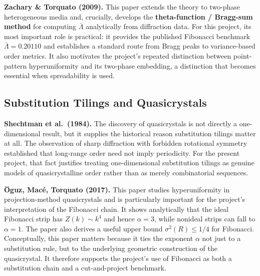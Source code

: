 \documentclass[11pt,letterpaper]{article}
\begin{document}
\vspace{0.4em}
\noindent\textbf{Zachary \& Torquato (2009).}
This paper extends the theory to two-phase heterogeneous media and, crucially, develops
the \textbf{theta-function / Bragg-sum method} for computing $\bar\Lambda$ analytically
from diffraction data.
For this project, its most important role is practical: it provides the published
Fibonacci benchmark $\bar\Lambda = 0.20110$ and establishes a standard route from Bragg
peaks to variance-based order metrics.
It also motivates the project's repeated distinction between point-pattern hyperuniformity
and its two-phase embedding, a distinction that becomes essential when spreadability is used.

\subsection{Substitution Tilings and Quasicrystals}

\noindent\textbf{Shechtman et al.\ (1984).}
The discovery of quasicrystals is not directly a one-dimensional result, but it supplies
the historical reason substitution tilings matter at all.
The observation of sharp diffraction with forbidden rotational symmetry established that
long-range order need not imply periodicity.
For the present project, that fact justifies treating one-dimensional substitution tilings
as genuine models of quasicrystalline order rather than as merely combinatorial sequences.

\vspace{0.4em}
\noindent\textbf{Öguz, Macé, Torquato (2017).}
This paper studies hyperuniformity in projection-method quasicrystals and is particularly
important for the project's interpretation of the Fibonacci chain.
It shows analytically that the ideal Fibonacci strip has $Z(k) \sim k^4$ and hence
$\alpha = 3$, while nonideal strips can fall to $\alpha = 1$.
The paper also derives a useful upper bound $\sigma^2(R) \leq 1/4$ for Fibonacci.
Conceptually, this paper matters because it ties the exponent $\alpha$ not just to a
substitution rule, but to the underlying geometric construction of the quasicrystal.
It therefore supports the project's use of Fibonacci as both a substitution chain and a
cut-and-project benchmark.
\end{document}
